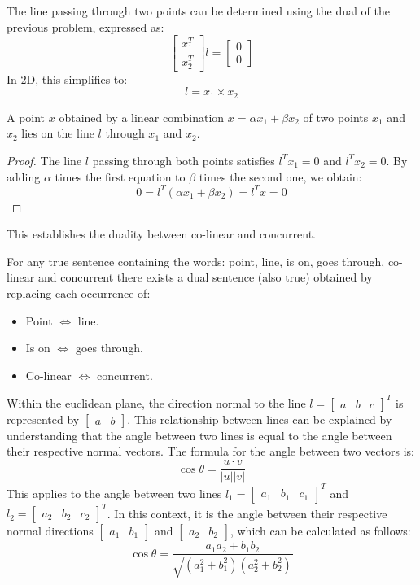 The line passing through two points can be determined using the dual of the previous problem, expressed as:
\[\begin{bmatrix} x_1^T \\ x_2^T \end{bmatrix} l = \begin{bmatrix} 0 \\ 0 \end{bmatrix}\]
In 2D, this simplifies to: 
\[l=x_1 \times x_2\] 
\begin{property}
    A point $x$ obtained by a linear combination $x=\alpha x_1+\beta x_2$ of two points $x_1$ and $x_2$ lies on the line $l$ through $x_1$ and $x_2$. 
\end{property}
\begin{proof}
    The line $l$ passing through both points satisfies  $l^Tx_1=0$ and  $l^Tx_2=0$. 
    By adding $\alpha$ times the first equation to $\beta$ times the second one, we obtain: 
    \[0=l^T\left( \alpha x_1+\beta x_2 \right)=l^Tx=0\]
\end{proof}
This establishes the duality between co-linear and concurrent.
\begin{theorem}
    For any true sentence containing the words: point, line, is on, goes through, co-linear and concurrent there exists a dual sentence (also true) obtained by replacing each occurrence of:
    \begin{itemize}
        \item Point $\Leftrightarrow$ line. 
        \item Is on $\Leftrightarrow$ goes through.
        \item Co-linear $\Leftrightarrow$ concurrent. 
    \end{itemize}
\end{theorem}
Within the euclidean plane, the direction normal to the line $l={\begin{bmatrix} a & b & c \end{bmatrix}}^T$ is represented by $\begin{bmatrix} a & b \end{bmatrix}$. 
This relationship between lines can be explained by understanding that the angle between two lines is equal to the angle between their respective normal vectors. 
The formula for the angle between two vectors is:
\[\cos\theta=\dfrac{u \cdot v}{\left\lvert u \right\rvert \left\lvert v \right\rvert}\] 
This applies to the angle between two lines $l_1={\begin{bmatrix} a_1 & b_1 & c_1 \end{bmatrix}}^T$ and $l_2={\begin{bmatrix} a_2 & b_2 & c_2 \end{bmatrix}}^T$. 
In this context, it is the angle between their respective normal directions $\begin{bmatrix} a_1 & b_1 \end{bmatrix}$ and $\begin{bmatrix} a_2 & b_2 \end{bmatrix}$, which can be calculated as follows:
\[\cos\theta=\dfrac{a_1a_2+b_1b_2}{\sqrt{\left( a_1^2 + b_1^2 \right)\left( a_2^2 + b_2^2 \right)}}\]

